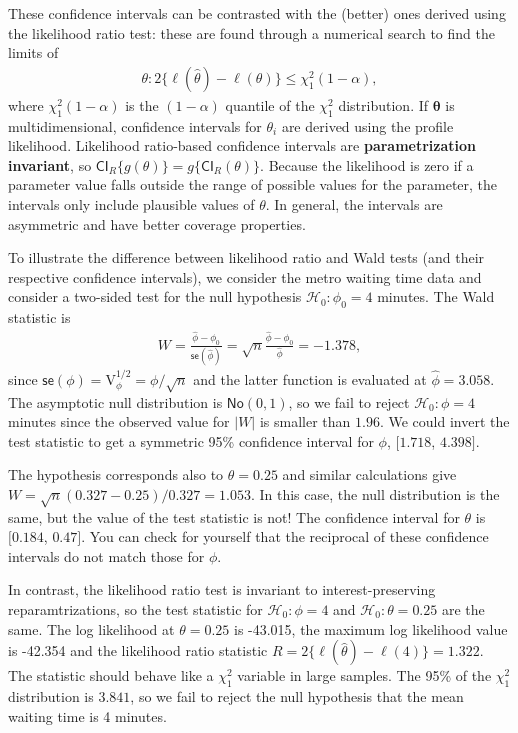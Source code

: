 \documentclass[
  11pt,
  letterpaper,
]{book}
\theoremstyle{definition}
\theoremstyle{definition}
\theoremstyle{definition}
\theoremstyle{definition}
\theoremstyle{remark}
\begin{document}
These confidence intervals can be contrasted with the (better) ones derived using the likelihood ratio test: these are found through a numerical search to find the limits of
\begin{align*}
\theta: 2\{\ell(\widehat{\theta}) - \ell(\theta)\} \leq \chi^2_1(1-\alpha),
\end{align*}
where \(\chi^2_1(1-\alpha)\) is the \((1-\alpha)\) quantile of the \(\chi^2_1\) distribution. If \(\boldsymbol{\theta}\) is multidimensional, confidence intervals for \(\theta_i\) are derived using the profile likelihood. Likelihood ratio-based confidence intervals are \textbf{parametrization invariant}, so \(\mathsf{CI}_{R}\{g(\theta)\} = g\{\mathsf{CI}_{R}(\theta)\}\). Because the likelihood is zero if a parameter value falls outside the range of possible values for the parameter, the intervals only include plausible values of \(\theta\). In general, the intervals are asymmetric and have better coverage properties.

To illustrate the difference between likelihood ratio and Wald tests (and their respective confidence intervals), we consider the metro waiting time data and consider a two-sided test for the null hypothesis \(\mathscr{H}_0: \phi_0=4\) minutes. The Wald statistic is
\begin{align*}
W =\frac{\hat{\phi}-\phi_0}{\mathsf{se}(\widehat{\phi})}=\sqrt{n}\frac{\widehat{\phi}-\phi_0}{\widehat{\phi}}= -1.378,
\end{align*}
since \(\mathsf{se}(\phi)=\mathrm{V}^{1/2}_{\phi}=\phi/\sqrt{n}\) and the latter function is evaluated at \(\widehat{\phi}=3.058\). The asymptotic null distribution is \(\mathsf{No}(0,1)\), so we fail to reject \(\mathscr{H}_0: \phi=4\) minutes since the observed value for \(|W|\) is smaller than \(1.96\). We could invert the test statistic to get a symmetric 95\% confidence interval for \(\phi\), \([1.718\), \(4.398]\).

The hypothesis corresponds also to \(\theta=0.25\) and similar calculations give \(W = \sqrt{n}(0.327 - 0.25)/0.327 = 1.053\). In this case, the null distribution is the same, but the value of the test statistic is not! The confidence interval for \(\theta\) is \([0.184\), \(0.47]\). You can check for yourself that the reciprocal of these confidence intervals do not match those for \(\phi\).

In contrast, the likelihood ratio test is invariant to interest-preserving reparamtrizations, so the test statistic for \(\mathscr{H}_0: \phi=4\) and \(\mathscr{H}_0: \theta = 0.25\) are the same. The log likelihood at \(\theta=0.25\) is -43.015, the maximum log likelihood value is -42.354
and the likelihood ratio statistic \(R=2 \{\ell(\widehat{\theta}) - \ell(4)\}= 1.322\). The statistic should behave like a \(\chi^2_1\) variable in large samples. The 95\% of the \(\chi^2_1\) distribution is \(3.841\), so we fail to reject the null hypothesis that the mean waiting time is 4 minutes.
\end{document}
